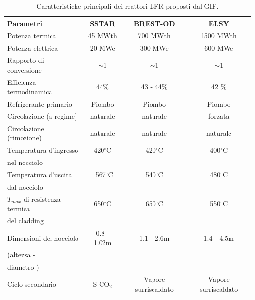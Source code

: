 \begin{table}[!htb]
\centering
\small
\begin{tabular}{l c c c}
\toprule
Parametri & SSTAR & BREST-OD & ELSY \\
\midrule
Potenza termica & 45 MWth & 700 MWth & 1500 MWth \\
Potenza elettrica & 20 MWe & 300 MWe & 600 MWe \\ 
Rapporto di conversione & $\sim$1 & $\sim$1 & $\sim$1 \\
Efficienza termodinamica & 44$\%$& 43 - 44$\%$ & 42 $\%$ \\
Refrigerante primario & Piombo & Piombo & Piombo \\
Circolazione (a regime) & naturale & naturale & forzata \\
Circolazione (rimozione)  & naturale & naturale & naturale \\
Temperatura d'ingresso & 420$^\circ$C & 420$^\circ$C & 400$^\circ$C \\ 
nel nocciolo           &  &  \\
Temperatura d'uscita & \ 567$^\circ$C & 540$^\circ$C & 480$^\circ$C \\ 
dal nocciolo  &  &  &\\
$T_{max}$ di resistenza termica & 650$^\circ$C & 650$^\circ$C & 550$^\circ$C\\ 
del cladding                    &  &  &\\
Dimensioni del nocciolo & 0.8 - 1.02m & 1.1 - 2.6m & 1.4 - 4.5m \\
(altezza -       &    &     \\
diametro  )   &    &     \\
Ciclo secondario & S-CO$_2$ & Vapore surriscaldato &  Vapore surriscaldato \\
\bottomrule
\end{tabular}
\caption{Caratteristiche principali dei reattori
LFR proposti dal GIF.}
\label{Starelsy}           
\end{table}

